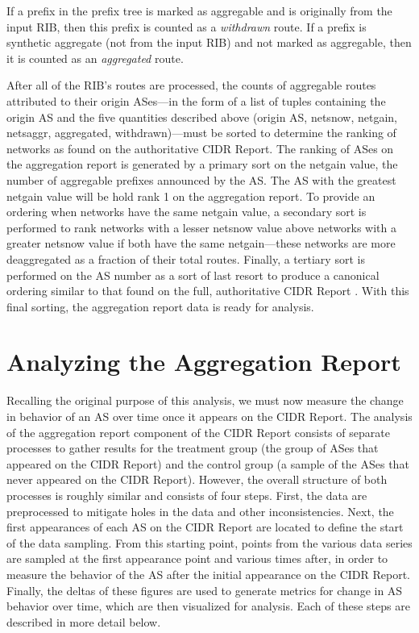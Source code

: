 If a prefix in the prefix tree is marked as aggregable and is originally from the input RIB, then this prefix is counted as a \emph{withdrawn} route. If a prefix is synthetic aggregate (not from the input RIB) and not marked as aggregable, then it is counted as an \emph{aggregated} route.

After all of the RIB's routes are processed, the counts of aggregable routes attributed to their origin ASes---in the form of a list of tuples containing the origin AS and the five quantities described above (origin AS, netsnow, netgain, netsaggr, aggregated, withdrawn)---must be sorted to determine the ranking of networks as found on the authoritative CIDR Report. The ranking of ASes on the aggregation report is generated by a primary sort on the netgain value, the number of aggregable prefixes announced by the AS. The AS with the greatest netgain value will be hold rank 1 on the aggregation report. To provide an ordering when networks have the same netgain value, a secondary sort is performed to rank networks with a lesser netsnow value above networks with a greater netsnow value if both have the same netgain---these networks are more deaggregated as a fraction of their total routes. Finally, a tertiary sort is performed on the AS number as a sort of last resort to produce a canonical ordering similar to that found on the full, authoritative CIDR Report \cite{cidr-report-full}. With this final sorting, the aggregation report data is ready for analysis.

\section{Analyzing the Aggregation Report}
\label{sec:method_agg_report_analysis}

Recalling the original purpose of this analysis, we must now measure the change in behavior of an AS over time once it appears on the CIDR Report. The analysis of the aggregation report component of the CIDR Report consists of separate processes to gather results for the treatment group (the group of ASes that appeared on the CIDR Report) and the control group (a sample of the ASes that never appeared on the CIDR Report). However, the overall structure of both processes is roughly similar and consists of four steps. First, the data are preprocessed to mitigate holes in the data and other inconsistencies. Next, the first appearances of each AS on the CIDR Report are located to define the start of the data sampling. From this starting point, points from the various data series are sampled at the first appearance point and various times after, in order to measure the behavior of the AS after the initial appearance on the CIDR Report. Finally, the deltas of these figures are used to generate metrics for change in AS behavior over time, which are then visualized for analysis. Each of these steps are described in more detail below.

